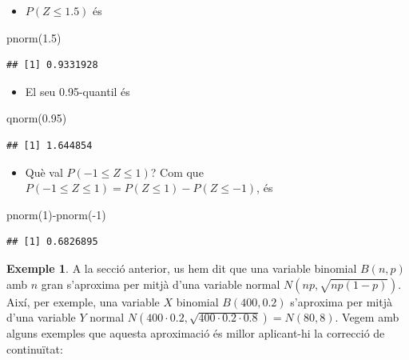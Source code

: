 \documentclass[
]{book}
\newenvironment{Shaded}{\begin{snugshade}}{\end{snugshade}}
\newcommand{\DecValTok}[1]{\textcolor[rgb]{0.00,0.00,0.81}{#1}}
\newcommand{\FloatTok}[1]{\textcolor[rgb]{0.00,0.00,0.81}{#1}}
\newcommand{\FunctionTok}[1]{\textcolor[rgb]{0.00,0.00,0.00}{#1}}
\newcommand{\NormalTok}[1]{#1}
\newcommand{\SpecialCharTok}[1]{\textcolor[rgb]{0.00,0.00,0.00}{#1}}
\providecommand{\tightlist}{%
  \setlength{\itemsep}{0pt}\setlength{\parskip}{0pt}}
\renewcommand{\leq}{\leqslant}
\theoremstyle{definition}
\theoremstyle{definition}
\newtheorem{example}{Exemple}[chapter]
\theoremstyle{definition}
\theoremstyle{remark}
\begin{document}
\begin{itemize}
\tightlist
\item
  \(P(Z\leq 1.5)\) és
\end{itemize}

\begin{Shaded}
\begin{Highlighting}[]
\FunctionTok{pnorm}\NormalTok{(}\FloatTok{1.5}\NormalTok{)}
\end{Highlighting}
\end{Shaded}

\begin{verbatim}
## [1] 0.9331928
\end{verbatim}

\begin{itemize}
\tightlist
\item
  El seu 0.95-quantil és
\end{itemize}

\begin{Shaded}
\begin{Highlighting}[]
\FunctionTok{qnorm}\NormalTok{(}\FloatTok{0.95}\NormalTok{)}
\end{Highlighting}
\end{Shaded}

\begin{verbatim}
## [1] 1.644854
\end{verbatim}

\begin{itemize}
\tightlist
\item
  Què val \(P(-1\leq Z\leq 1)\)? Com que \(P(-1\leq Z\leq 1)=P(Z\leq 1)-P(Z\leq -1)\), és
\end{itemize}

\begin{Shaded}
\begin{Highlighting}[]
\FunctionTok{pnorm}\NormalTok{(}\DecValTok{1}\NormalTok{)}\SpecialCharTok{{-}}\FunctionTok{pnorm}\NormalTok{(}\SpecialCharTok{{-}}\DecValTok{1}\NormalTok{)}
\end{Highlighting}
\end{Shaded}

\begin{verbatim}
## [1] 0.6826895
\end{verbatim}

\begin{example}
\protect\hypertarget{exm:corrcont}{}{\label{exm:corrcont} }A la secció anterior, us hem dit que una variable binomial \(B(n,p)\) amb \(n\) gran s'aproxima per mitjà d'una variable normal \(N(np,\sqrt{np(1-p)})\). Així, per exemple, una variable \(X\) binomial \(B(400,0.2)\) s'aproxima per mitjà d'una variable \(Y\) normal \(N(400\cdot 0.2,\sqrt{400\cdot 0.2\cdot 0.8})=N(80,8)\). Vegem amb alguns exemples que aquesta aproximació és millor aplicant-hi la correcció de continuïtat:
\end{example}
\end{document}
